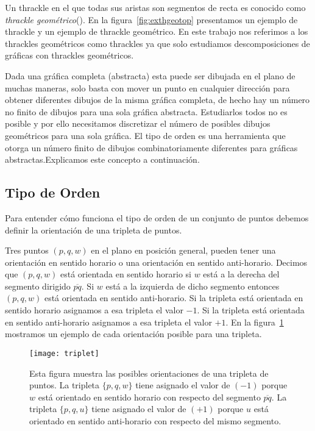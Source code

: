 Un thrackle en el que todas sus aristas son segmentos de recta es conocido como
\emph{thrackle geométrico}(\cite{Schaefer2018}). En la
figura~\ref{fig:exthgeotop} presentamos un ejemplo de thrackle y un ejemplo de
thrackle geométrico. En este trabajo nos referimos a los thrackles geométricos
como thrackles ya que solo estudiamos descomposiciones de gráficas con
thrackles geométricos.

Dada una gráfica completa (abstracta) esta puede ser dibujada en el plano
de muchas maneras, solo basta con mover un punto en cualquier dirección
para obtener diferentes dibujos de la misma gráfica completa, de hecho
hay un número no finito de dibujos para una sola gráfica abstracta. Estudiarlos
todos no es posible y por ello necesitamos discretizar el número de
posibles dibujos geométricos para una sola gráfica. El tipo de orden es
una herramienta que otorga un número finito de dibujos combinatoriamente
diferentes para gráficas abstractas.Explicamos este concepto a continuación.

\subsection{Tipo de Orden}

Para entender cómo funciona el tipo de orden de un conjunto de puntos
debemos definir la orientación de una tripleta de puntos.

Tres puntos $(p,q,w)$ en el plano en posición general, pueden tener una
orientación en sentido horario o una orientación en sentido anti-horario.
Decimos que $(p,q,w)$ está orientada en sentido horario si $w$ está a la
derecha del segmento dirigido $\overline{pq}$. Si $w$ está a la izquierda
de dicho segmento entonces $(p,q,w)$ está orientada en sentido anti-horario.
Si la tripleta está orientada en sentido horario asignamos a esa tripleta el
valor $-1$. Si la tripleta está orientada en sentido anti-horario asignamos a
esa tripleta el valor $+1$. En la figura~\ref{fig:triplet} mostramos un ejemplo
de cada orientación posible para una tripleta.
\begin{figure}[htpb]
  \centering
  \texttt{[image: triplet]}
  \caption{Esta figura muestra las posibles orientaciones de una tripleta de
  puntos. La tripleta $\{p,q,w\}$ tiene asignado el valor de $(-1)$ porque $w$
  está orientado en sentido horario con respecto del segmento $\overline{pq}$.
  La tripleta $\{p,q,u\}$ tiene asignado el valor de $(+1)$  porque $u$ está
  orientado en sentido anti-horario con respecto del mismo segmento.}
  \label{fig:triplet}
\end{figure}

